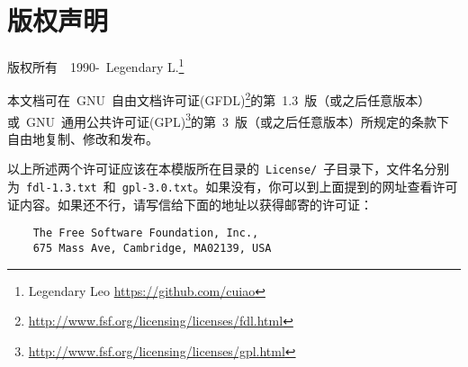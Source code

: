 \cleardoublepage
\chapter{版权声明}
版权所有~\textcopyright~1990-\the\year~Legendary L.\footnote{Legendary Leo \url{https://github.com/cuiao}}

本文档可在~GNU~自由文档许可证(GFDL)\footnote{\url{http://www.fsf.org/licensing/licenses/fdl.html}}的第~1.3~版（或之后任意版本）或~GNU~通用公共许可证(GPL)\footnote{\url{http://www.fsf.org/licensing/licenses/gpl.html}}的第~3~版（或之后任意版本）所规定的条款下自由地复制、修改和发布。


以上所述两个许可证应该在本模版所在目录的~\verb|License/|~子目录下，文件名分别为~\verb|fdl-1.3.txt|~和~\verb|gpl-3.0.txt|。如果没有，你可以到上面提到的网址查看许可证内容。如果还不行，请写信给下面的地址以获得邮寄的许可证：
\begin{verbatim}
    The Free Software Foundation, Inc.,
    675 Mass Ave, Cambridge, MA02139, USA
\end{verbatim}